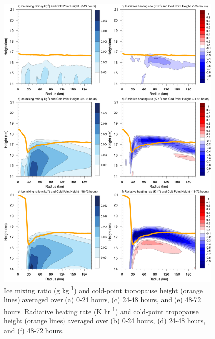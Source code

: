 \documentclass{ametsoc}
\begin{document}

\begin{figure}[ht]
\centerline{\includegraphics[width=27pc]{figures/qi+radten.png}}
\caption{Ice mixing ratio (g kg\textsuperscript{-1}) and cold-point tropopause height (orange lines) averaged over (a) 0-24 hours, (c) 24-48 hours, and (e) 48-72 hours. Radiative heating rate (K hr\textsuperscript{-1}) and cold-point tropopause height (orange lines) averaged over (b) 0-24 hours, (d) 24-48 hours, and (f) 48-72 hours.} 
\label{fig:qi+radten}
\end{figure}
\end{document}
